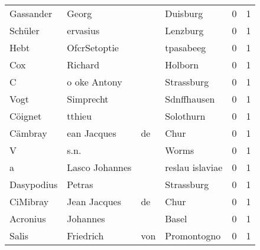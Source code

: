\documentclass[10pt,a4paper,landscape]{article}
\begin{document}
\begin{longtable}{llllrr}
                Gassander &                              Georg &             &                                    Duisburg &          0 &         1 \\
                  Schüler &                           ervasius &             &                                    Lenzburg &          0 &         1 \\
                     Hebt &                       OfcrSetoptie &             &                                   tpasabeeg &          0 &         1 \\
                      Cox &                            Richard &             &                                     Holborn &          0 &         1 \\
                        C &                       o oke Antony &             &                                  Strassburg &          0 &         1 \\
                     Vogt &                          Simprecht &             &                                 Sdnffhausen &          0 &         1 \\
                  Cöignet &                             tthieu &             &                                   Solothurn &          0 &         1 \\
                  Cämbray &                        ean Jacques &          de &                                        Chur &          0 &         1 \\
                        V &                               s.n. &             &                                       Worms &          0 &         1 \\
                        a &                     Lasco Johannes &             &                             reslau islaviae &          0 &         1 \\
               Dasypodius &                             Petras &             &                                  Strassburg &          0 &         1 \\
                 CiMibray &                       Jean Jacques &          de &                                        Chur &          0 &         1 \\
                 Acronius &                           Johannes &             &                                       Basel &          0 &         1 \\
                    Salis &                          Friedrich &         von &                                 Promontogno &          0 &         1 \\

\end{longtable}
\end{document}
